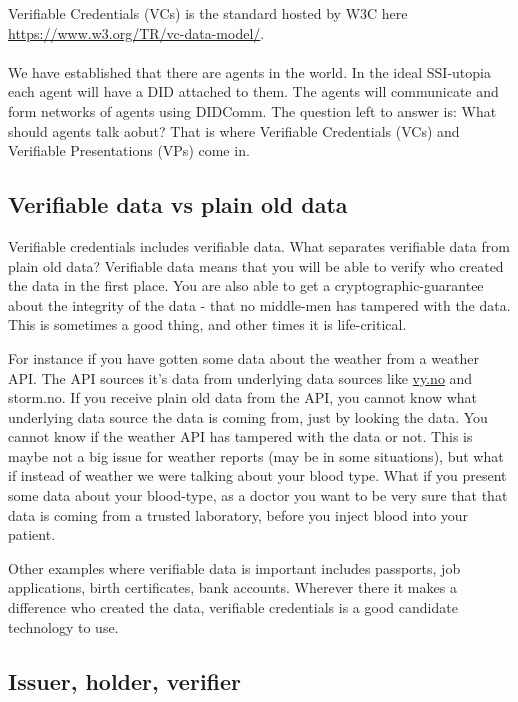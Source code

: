 Verifiable Credentials (VCs) is the standard hosted by W3C here \url{https://www.w3.org/TR/vc-data-model/}.

\paragraph{}

We have established that there are agents in the world. In the ideal
SSI-utopia each agent will have a DID attached to them. The agents will
communicate and form networks of agents using DIDComm. The question left
to answer is: What should agents talk aobut? That is where Verifiable
Credentials (VCs) and Verifiable Presentations (VPs) come in.



\subsection{Verifiable data vs plain old data}

Verifiable credentials includes verifiable data. What separates verifiable data from plain old
data? Verifiable data means that you will be able to verify who created
the data in the first place. You are also able to get a
cryptographic-guarantee about the integrity of the data - that no
middle-men has tampered with the data. This is sometimes a good thing,
and other times it is life-critical.

For instance if you have gotten some data about the weather from a
weather API. The API sources it's data from underlying data sources like
\href{http://vy.no}{vy.no} and storm.no. If you receive plain old data
from the API, you cannot know what underlying data source the data is
coming from, just by looking the data. You cannot know if the weather
API has tampered with the data or not. This is maybe not a big issue for
weather reports (may be in some situations), but what if instead of
weather we were talking about your blood type. What if you present some
data about your blood-type, as a doctor you want to be very sure that
that data is coming from a trusted laboratory, before you inject blood
into your patient.

Other examples where verifiable data is important includes passports,
job applications, birth certificates, bank accounts. Wherever there it
makes a difference who created the data, verifiable credentials is a
good candidate technology to use.


\subsection{Issuer, holder, verifier}


